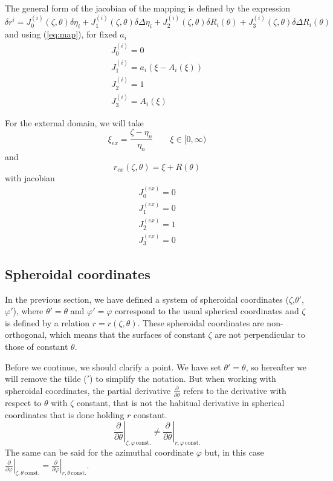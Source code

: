 The general form of the jacobian of the mapping is defined by the expression
\begin{equation}
\delta r^{i}=J_0^{(i)}(\zeta,\theta)\delta\eta_i+J_1^{(i)}(\zeta,\theta)\delta\Delta\eta_i
+J_2^{(i)}(\zeta,\theta)\delta R_i(\theta)+J_3^{(i)}(\zeta,\theta)\delta\Delta R_i(\theta)
\end{equation}
and using (\ref{eq:map}), for fixed $a_i$
\begin{equation}
\begin{array}{l}
J_0^{(i)}=0\\
J_1^{(i)}=a_i(\xi-A_i(\xi))\\
J_2^{(i)}=1\\
J_3^{(i)}=A_i(\xi)
\end{array}
\end{equation}

For the external domain, we will take 
\begin{equation}
\xi_{ex}=\frac{\zeta-\eta_n}{\eta_n} \qquad \xi\in[0,\infty)
\end{equation}
and
\begin{equation}
r_{ex}(\zeta,\theta)=\xi+R(\theta)
\end{equation}
with jacobian
\begin{equation}
\begin{array}{l}
J_0^{(ex)}=0\\
J_1^{(ex)}=0\\
J_2^{(ex)}=1\\
J_3^{(ex)}=0
\end{array}
\end{equation}

\subsection{Spheroidal coordinates}

In the previous section, we have defined a system of spheroidal coordinates ($\zeta$,$\theta'$,$\varphi'$), 
where $\theta'=\theta$ and $\varphi'=\varphi$ correspond to the usual spherical coordinates and $\zeta$ is
defined by a relation $r=r(\zeta,\theta)$. These spheroidal coordinates are non-orthogonal, which means
that the surfaces of constant $\zeta$ are not perpendicular to those of constant $\theta$.

Before we continue, we should clarify a point. We have set $\theta'=\theta$, so hereafter we will remove
the tilde ($'$) to simplify the notation. But when working with spheroidal coordinates, the partial
derivative $\frac{\partial}{\partial\theta}$ refers to the derivative with respect to $\theta$ with $\zeta$
constant, that is not the habitual derivative in spherical coordinates that is done holding $r$ constant.
$$\left.\frac{\partial}{\partial\theta}\right|_{\zeta,\varphi\,\mathrm{const.}}\ne
\left.\frac{\partial}{\partial\theta}\right|_{r,\varphi\,\mathrm{const.}}$$
The same can be said for the azimuthal coordinate $\varphi$ but, in this case 
$\left.\frac{\partial}{\partial\varphi}\right|_{\zeta,\theta\,\mathrm{const.}}=
\left.\frac{\partial}{\partial\varphi}\right|_{r,\theta\,\mathrm{const.}}$.

